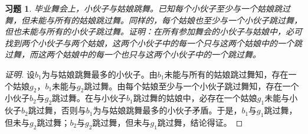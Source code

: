 \documentclass{article}
\begin{document}
\begin{CJK}{UTF8}{gbsn}
\newtheorem*{Exercise}{习题}
\begin{Exercise}
  毕业舞会上，小伙子与姑娘跳舞。已知每个小伙子至少与一个姑娘跳过舞，但未能与所有的姑娘跳过舞。同样的，每个姑娘也至少与一个小伙子跳过舞，但也未能与所有的小伙子跳过舞。证明：在所有参加舞会的小伙子与姑娘中，必可找到两个小伙子与两个姑娘，这两个小伙子中的每一个只与这两个姑娘中的一个跳过舞，而这两个姑娘中的每一个也只与这两个小伙子中的一个跳过舞。
\end{Exercise}
\begin{proof}[证明]设$b_1$为与姑娘跳舞最多的小伙子。由$b_1$未能与所有的姑娘跳过舞知，存在一个姑娘$g_2$，$b_1$未能与$g_2$跳过舞。由每个姑娘至少与一个小伙子跳过舞知，存在一个小伙子$b_2$与$g_2$跳过舞。在与小伙子$b_1$跳过舞的姑娘中，必存在一个姑娘$g_1$未能与小伙子$b_2$跳过舞，否则与$b_1$为与姑娘跳舞最多的小伙子矛盾。于是，$b_1$与$g_1$跳过舞，但未与$g_2$跳过舞；$b_2$与$g_2$跳过舞，但未与$g_1$跳过舞，结论得证。  
\end{proof}

\end{CJK}
\end{document}
